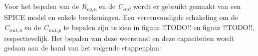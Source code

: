 \documentclass{article}
\begin{document}
\newcommand{\tss}{\textsubscript}
\newcommand{\tsss}{\textsuperscript}


Voor het bepalen van de \emph{R\tss{eq,n}} en de \emph{C\tss{out}} wordt er gebruikt gemaakt van een SPICE model en enkele berekeningen. Een vereenvoudigde schakeling om de \emph{C\tss{out,n}} en de \emph{C\tss{out,p}} te bepalen zijn te zien in figuur !!TODO!! en figuur !!TODO!!, respectievelijk. Het bepalen van deze weerstand en deze capaciteiten wordt gedaan aan de hand van het volgende stappenplan:
\end{document}
